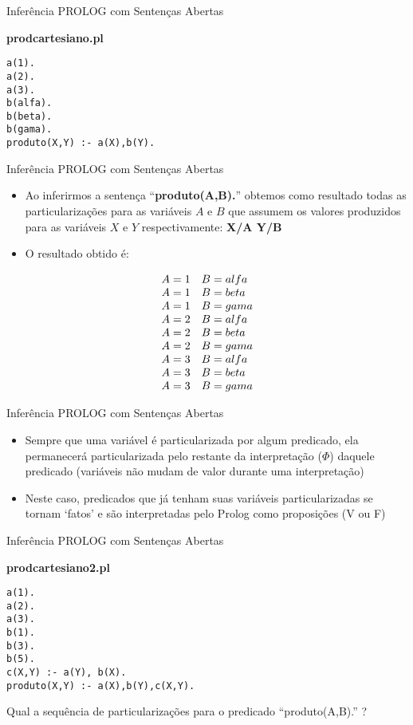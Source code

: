 \begin{frame}[fragile]{Inferência PROLOG com Sentenças Abertas}
\begin{center}
{\bf prodcartesiano.pl}
\end{center}

\begin{lstlisting}
a(1).
a(2).
a(3).
b(alfa).
b(beta).
b(gama).
produto(X,Y) :- a(X),b(Y).
\end{lstlisting}
\end{frame}


\begin{frame}[t]{Inferência PROLOG com Sentenças Abertas}
	\begin{itemize}
	\item Ao inferirmos a sentença ``{\bf produto(A,B).}'' obtemos como resultado todas as particularizações para as variáveis $A$ e $B$ que assumem os valores produzidos para as variáveis $X$ e $Y$ respectivamente: {\bf X/A Y/B}
	\item O resultado obtido é:
	\end{itemize}
	$$\begin{array}{l l}A = 1 & B = alfa \\ A = 1 & B = beta \\ A = 1 & B = gama\\ A = 2 & B = alfa \\ A = 2 & B = beta \\ A = 2 & B = gama\\ A = 3 & B = alfa \\ A = 3 & B = beta \\ A = 3 & B = gama \end{array}$$
\end{frame}


\begin{frame}[t]{Inferência PROLOG com Sentenças Abertas}
	\begin{itemize}
	\item Sempre que uma variável é particularizada por algum predicado, ela permanecerá particularizada pelo restante da interpretação ($\Phi$) daquele predicado (variáveis não mudam de valor durante uma interpretação)
	\item Neste caso, predicados que já tenham suas variáveis particularizadas se tornam `fatos' e são interpretadas pelo Prolog como proposições (V ou F)
	\end{itemize}
\end{frame}


\begin{frame}[fragile]{Inferência PROLOG com Sentenças Abertas}
\begin{center}
{\bf prodcartesiano2.pl}
\end{center}

\begin{lstlisting}
a(1).
a(2).
a(3).
b(1).
b(3).
b(5).
c(X,Y) :- a(Y), b(X).
produto(X,Y) :- a(X),b(Y),c(X,Y).
\end{lstlisting}

\begin{center}
Qual a sequência de particularizações para o predicado ``produto(A,B).'' ?
\end{center}
\end{frame}

